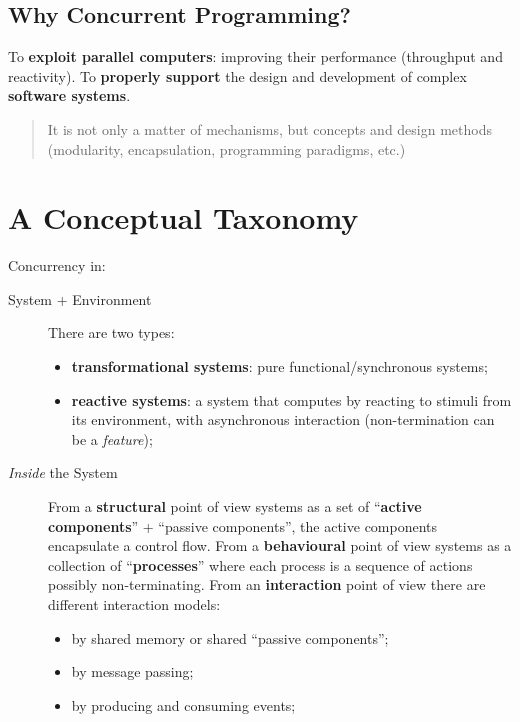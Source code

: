 \subsection{Why Concurrent Programming?}\label{sub:ow_why_concurrent_programming} %
To \textbf{exploit parallel computers}: improving their performance (throughput and reactivity).
\emptyln{}
To \textbf{properly support} the design and development of complex \textbf{software systems}.
\begin{quote}
    It is not only a matter of mechanisms, but concepts and design methods (modularity, encapsulation, programming paradigms, etc.)
\end{quote}
%
\section{A Conceptual Taxonomy}\label{sec:ow_a_conceptual_taxonomy} %
Concurrency in:
\begin{description}
    \item[System + Environment] There are two types:
        \begin{itemize}
            \item \textbf{transformational systems}: pure functional/synchronous systems;
            \item \textbf{reactive systems}: a system that computes by reacting to stimuli from its environment, with asynchronous interaction (non-termination can be a \textit{feature});
        \end{itemize}
    \item[\textit{Inside} the System] From a \textbf{structural} point of view systems as a set of ``\textbf{active components}'' + ``passive components'', the active components encapsulate a control flow.
        \emptyln{}
        From a \textbf{behavioural} point of view systems as a collection of ``\textbf{processes}'' where each process is a sequence of actions possibly non-terminating.
        \emptyln{}
        From an \textbf{interaction} point of view there are different interaction models:
        \begin{itemize}
            \item by shared memory or shared ``passive components'';
            \item by message passing;
            \item by producing and consuming events;
        \end{itemize}
\end{description}
%
